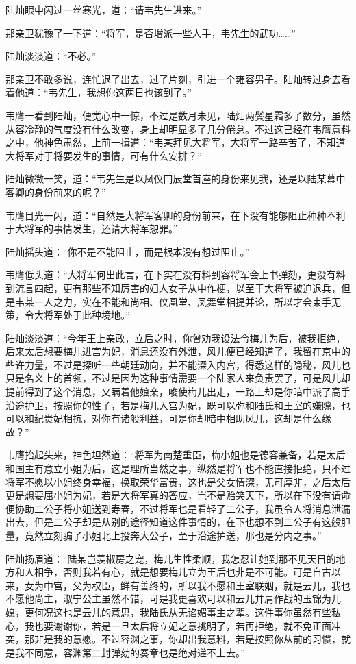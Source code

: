 陆灿眼中闪过一丝寒光，道：“请韦先生进来。”

那亲卫犹豫了一下道：“将军，是否增派一些人手，韦先生的武功……”

陆灿淡淡道：“不必。”

那亲卫不敢多说，连忙退了出去，过了片刻，引进一个雍容男子。陆灿转过身去看着他道：“韦先生，我想你这两日也该到了。”

韦膺一看到陆灿，便觉心中一惊，不过是数月未见，陆灿两鬓星霜多了数分，虽然从容冷静的气度没有什么改变，身上却明显多了几分倦怠。不过这已经在韦膺意料之中，他神色肃然，上前一揖道：“韦某拜见大将军，大将军一路辛苦了，不知道大将军对于将要发生的事情，可有什么安排？”

陆灿微微一笑，道：“韦先生是以凤仪门辰堂首座的身份来见我，还是以陆某幕中客卿的身份前来的呢？”

韦膺目光一闪，道：“自然是大将军客卿的身份前来，在下没有能够阻止种种不利于大将军的事情发生，还请大将军恕罪。”

陆灿摇头道：“你不是不能阻止，而是根本没有想过阻止。”

韦膺低头道：“大将军何出此言，在下实在没有料到容将军会上书弹劾，更没有料到流言四起，更有那些不知厉害的妇人女子从中作梗，以至于大将军被迫退兵，但是韦某一人之力，实在不能和尚相、仪凰堂、凤舞堂相提并论，所以才会束手无策，令大将军处于此种境地。”

陆灿淡淡道：“今年王上亲政，立后之时，你曾劝我设法令梅儿为后，被我拒绝，后来太后想要梅儿进宫为妃，消息还没有外泄，风儿便已经知道了，我留在京中的些许力量，不过是探听一些朝廷动向，并不能深入内宫，得悉这样的隐秘，风儿也只是名义上的首领，不过是因为这种事情需要一个陆家人来负责罢了，可是风儿却提前得到了这个消息，又瞒着他娘亲，唆使梅儿出走，一路上却是你暗中派了高手沿途护卫，按照你的性子，若是梅儿入宫为妃，既可以弥和陆氏和王室的嫌隙，也可以和纪贵妃相抗，对你有诸般利益，可是你却暗中相助风儿，这却是什么缘故？”

韦膺抬起头来，神色坦然道：“将军为南楚重臣，梅小姐也是德容兼备，若是太后和国主有意立小姐为后，这是理所当然之事，纵然是将军也不能直接拒绝，只不过将军不愿以小姐终身幸福，换取荣华富贵，这也是父女情深，无可厚非，之后太后更是想要屈小姐为妃，若是大将军真的答应，岂不是贻笑天下，所以在下没有请命便协助二公子将小姐送到寿春，不过将军也是看轻了二公子，我虽令人将消息泄漏出去，但是二公子却是从别的途径知道这件事情的，在下也想不到二公子有这般胆量，竟然立刻骗了小姐北上投奔大公子，至于沿途护送，那也是分内之事。”

陆灿扬眉道：“陆某岂羡椒房之宠，梅儿生性柔顺，我怎忍让她到那不见天日的地方和人相争，否则我若有心，就是想要梅儿立为王后也非是不可能。可是自古以来，女为中宫，父为权臣，鲜有善终的，所以我不愿和王室联姻，就是云儿，我也不愿他尚主，淑宁公主虽然不错，可是我更喜欢可以和云儿并肩作战的玉锦为儿媳，更何况这也是云儿的意思，我陆氏从无谄媚事主之辈。这件事你虽然有些私心，我也要谢谢你，若是一旦太后将立妃之意挑明了，若再拒绝，就不免正面冲突，那非是我的意愿。不过容渊之事，你却出我意料，若是按照你从前的习惯，就是我不同意，容渊第二封弹劾的奏章也是绝对递不上去。”

